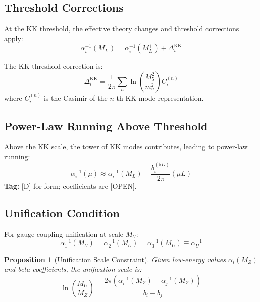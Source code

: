 \documentclass[11pt,a4paper]{article}
\newtheorem{proposition}[theorem]{Proposition}
\begin{document}
\subsection{Threshold Corrections}

At the KK threshold, the effective theory changes and threshold corrections apply:
\begin{equation}
  \alpha_i^{-1}(M_L^-) = \alpha_i^{-1}(M_L^+) + \Delta_i^{\text{KK}}
  \label{eq:threshold}
\end{equation}

The KK threshold correction is:
\begin{equation}
  \Delta_i^{\text{KK}} = \frac{1}{2\pi} \sum_n \ln\left(\frac{M_5^2}{m_n^2}\right) C_i^{(n)}
  \label{eq:kk-threshold-correction}
\end{equation}
where $C_i^{(n)}$ is the Casimir of the $n$-th KK mode representation.

\subsection{Power-Law Running Above Threshold}

Above the KK scale, the tower of KK modes contributes, leading to power-law running:
\begin{equation}
  \alpha_i^{-1}(\mu) \approx \alpha_i^{-1}(M_L) - \frac{b_i^{(5D)}}{2\pi} (\mu L)
  \label{eq:power-law}
\end{equation}
\textbf{Tag:} [D] for form; coefficients are [OPEN].

\subsection{Unification Condition}

For gauge coupling unification at scale $M_U$:
\begin{equation}
  \alpha_1^{-1}(M_U) = \alpha_2^{-1}(M_U) = \alpha_3^{-1}(M_U) \equiv \alpha_U^{-1}
  \label{eq:unification}
\end{equation}

\begin{proposition}[Unification Scale Constraint]
\label{prop:unification-scale}
Given low-energy values $\alpha_i(M_Z)$ and beta coefficients, the unification scale is:
\begin{equation}
  \ln\left(\frac{M_U}{M_Z}\right) = \frac{2\pi(\alpha_i^{-1}(M_Z) - \alpha_j^{-1}(M_Z))}{b_i - b_j}
  \label{eq:mu-constraint}
\end{equation}
\end{proposition}
\end{document}
